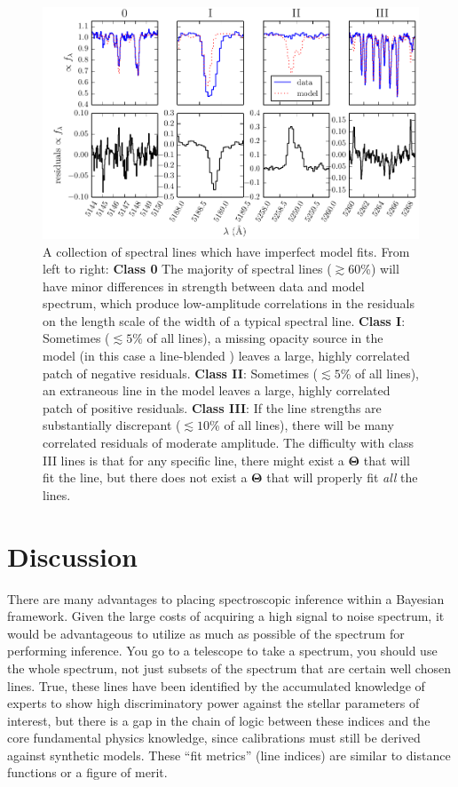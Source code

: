 \documentclass[iop,floatfix]{emulateapj}
\newcommand{\vT}{ {\bm \Theta}}
\begin{document}
\begin{figure}[!htb]
\begin{center}
  \includegraphics{figs/badlines.pdf}
  \caption{A collection of spectral lines which have imperfect model fits.
    From left to right: \textbf{Class 0} The majority of spectral lines
    ($\gtrsim 60$\%) will have minor differences in strength between data and
    model spectrum, which produce low-amplitude correlations in the residuals
    on the length scale of the width of a typical spectral line.  \textbf{Class
    I}: Sometimes ($\lesssim 5$\% of all lines), a missing opacity source in
    the model (in this case a line-blended ) leaves a large, highly correlated
    patch of negative residuals.  \textbf{Class II}: Sometimes ($\lesssim 5$\%
    of all lines), an extraneous line in the model leaves a large, highly
    correlated patch of positive residuals.  \textbf{Class III}: If the line strengths are
    substantially discrepant ($\lesssim 10$\% of all lines), there will be many
    correlated residuals of moderate amplitude.  The difficulty
    with class III lines is that for any specific line, there might exist a
    $\vT$ that will fit the line, but there does not exist a $\vT$ that
    will properly fit \emph{all} the lines.}
\label{fig:badlines}
\end{center}
\end{figure}


\section{Discussion}
\label{sec:discussion}
There are many advantages to placing spectroscopic inference within a Bayesian framework. Given the large costs of acquiring a high signal to noise spectrum, it would be advantageous to utilize as much as possible of the spectrum for performing inference. You go to a telescope to take a spectrum, you should use the whole spectrum, not just subsets of the spectrum that are certain well chosen lines. True, these lines have been identified by the accumulated knowledge of experts to show high discriminatory power against the stellar parameters of interest, but there is a gap in the chain of logic between these indices and the core fundamental physics knowledge, since calibrations must still be derived against synthetic models. These ``fit metrics'' (line indices) are similar to distance functions or a figure of merit.
\end{document}
